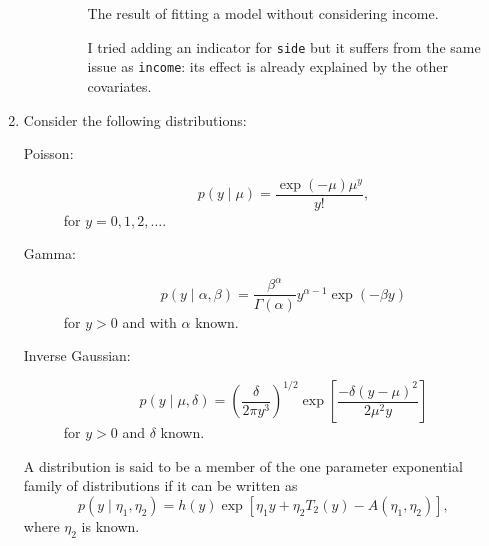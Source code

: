 \documentclass[letterpaper,11pt]{article}
\begin{document}
\begin{enumerate}
\begin{enumerate}
\begin{description}
      \begin{table}
        \centering
        
        \caption{The result of fitting a model without considering income.}
        \label{tab:p1_model_parameters_custom}
      \end{table}

      I tried adding an indicator for \texttt{side} but it suffers from the same
      issue as \texttt{income}: its effect is already explained by the other
      covariates.
    \end{description}
  \end{enumerate}

  \pagebreak
\item Consider the following distributions:
  \begin{description}
  \item[Poisson:] \begin{equation}
      p\left(y \mid \mu\right) = \frac{\exp\left(-\mu\right)\mu^y}{y!},
      \label{eqn:p2_poisson}
    \end{equation}
    for $y = 0,1,2,\ldots$.
    
  \item[Gamma:] \begin{equation}
      p\left(y \mid \alpha, \beta\right) =
      \frac{\beta^\alpha}{\Gamma(\alpha)}y^{\alpha - 1}\exp(-\beta y)
      \label{eqn:p2_gamma}
    \end{equation}
    for $y > 0$ and with $\alpha$ known.
    
  \item[Inverse Gaussian:]
    \begin{equation*}
      p\left(y \mid \mu, \delta\right) =
      \left(\frac{\delta}{2\pi y^3}\right)^{1/2}
      \exp\left[
        \frac{-\delta\left(y-\mu\right)^2}{2\mu^2y}
      \right]
      \label{eqn:p2_inverse_gaussian}
    \end{equation*}
    for $y > 0$ and $\delta$ known.

  \end{description}

  A distribution is said to be a member of the one parameter exponential family
  of distributions if it can be written as
  \begin{equation}
    p\left(y \mid \eta_1,\eta_2\right) = h(y)\exp\left[
      \eta_1y + \eta_2T_2(y) - A\left(\eta_1,\eta_2\right)
    \right],
    \label{eqn:p2_exponential}    
  \end{equation}
  where $\eta_2$ is known.
  

\end{enumerate}
\end{document}
